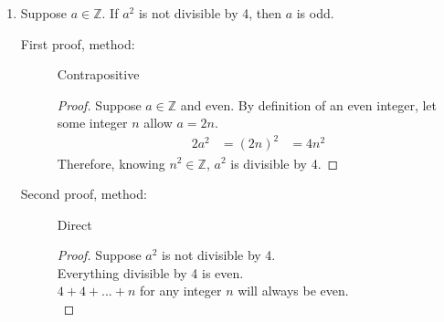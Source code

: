 \documentclass{article}
\begin{document}
\begin{enumerate}
\begin{description}
    \item[Second proof, method:] Direct
  \end{description}
  \begin{proof} Assume $x$ and $y$ have the same parity. \\ \\
  Case 1. $x$ and $y$ are even. \\
  \hspace*{6mm} There exists integers $a$ and $b$ for which $x=2a$ and $y=2b$ by definition of even numbers.
  \begin{alignat*}{2}
  x+y &= 2a+2b \\
  &= 2(a+b)
  \end{alignat*}
  By definition of a even number, $2(a+b)$ will always be even. \\
  Therefore, two integers of the even parity have an even sum. \\
  \\ Case 2. $x$ and $y$ are odd. \\
  \hspace*{6mm} There exists integers $a$ and $b$ for which $x=2a+1$ and $y=2b+1$ by definition of even numbers.
  \begin{alignat*}{2}
  x+y &= 2a+1+2b+1 \\
  &= 2(a+b)+2
  \end{alignat*}
  By definition of a odd number, $2(a+b)+2$ will always be even. \\
  Therefore, two integers of the odd parity will always be even.
  \end{proof}
  
\item Suppose $a\in\mathbb{Z}$.  If $a^2$ is not divisible by 4,
  then $a$ is odd.
  \begin{description}
    \item[First proof, method:] Contrapositive
    \begin{proof}
    Suppose $a\in\mathbb{Z}$ and even. By definition of an even integer, let some integer $n$ allow $a=2n$.
    \begin{alignat*}{2}
    a^2 &= (2n)^2 
    &= 4n^2
    \end{alignat*}
    Therefore, knowing $n^2\in\mathbb{Z}$, $a^2$ is divisible by 4.
    \end{proof}
    \item[Second proof, method:] Direct
    \begin{proof}
    	Suppose $a^2$ is not divisible by 4. \\
        Everything divisible by 4 is even. \\
        $4+4+...+n$ for any integer $n$ will always be even. \\
        

\end{proof}
\end{description}
\end{enumerate}
\end{document}
